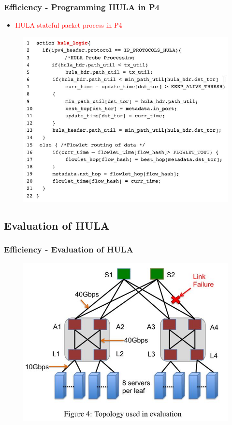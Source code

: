 \documentclass{beamer}
\begin{document}
\begin{frame}
	\frametitle{Efficiency - Programming HULA in P4}
	\begin{itemize}
		\item\textcolor{red}{HULA stateful packet process in P4}\\
	\end{itemize}
	
			\begin{figure}
				\includegraphics[width=0.75\linewidth]{17}
			\end{figure}
\end{frame}

 \subsection{Evaluation of HULA}
 \begin{frame}
 	\frametitle{Efficiency - Evaluation of HULA}
 	
 	\begin{figure}
 		\includegraphics[width=0.8\linewidth]{18}
 	\end{figure}
 \end{frame}
 
\end{document}
